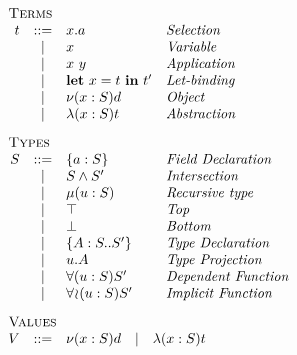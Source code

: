 \begin{minipage}[t]{.5\textwidth}\[\begin{array}{r c l l}
    \multicolumn{4}{l}{\textsc{Terms}}                      \\
    t & ::= & x.a             & \textit{Selection         } \\
      &  |  & x               & \textit{Variable          } \\
      &  |  & x\ y            & \textit{Application       } \\
      &  |  & \LET{x}{t}{t'}  & \textit{Let-binding       } \\
      &  |  & \OBJ{x}{S}{d}   & \textit{Object            } \\
      &  |  & \ABS{x}{S}{t}   & \textit{Abstraction       } \\[3mm]
    \multicolumn{4}{l}{\textsc{Types}}                      \\
    S & ::= & \FDEC{a}{S}     & \textit{Field Declaration } \\
      &  |  & \AGG{S}{S'}     & \textit{Intersection      } \\
      &  |  & \REC{u}{S}      & \textit{Recursive type    } \\
      &  |  & \top            & \textit{Top               } \\
      &  |  & \bot            & \textit{Bottom            } \\
      &  |  & \TDEC{A}{S}{S'} & \textit{Type Declaration  } \\
      &  |  & u.A             & \textit{Type Projection   } \\
      &  |  & \DFUN{u}{S}{S'} & \textit{Dependent Function} \\
      &  |  & \IFUN{u}{S}{S'} & \textit{Implicit Function } \\[3mm]
    \multicolumn{4}{l}{\textsc{Values}} \\
    V & ::= & \multicolumn{2}{l}{\OBJ{x}{S}{d}
        \quad | \quad \ABS{x}{S}{t}} \\[3mm]
\end{array}\]\end{minipage}
